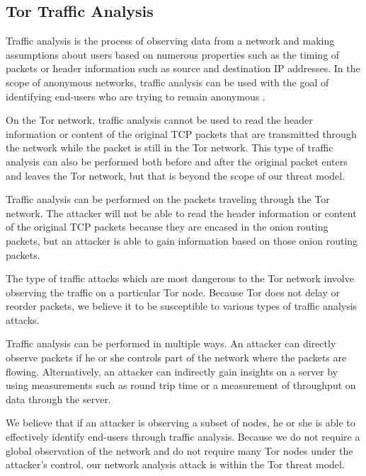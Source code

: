 \documentclass[12pt,journal]{IEEEtran}
\begin{document}
\subsection{Tor Traffic Analysis}
Traffic analysis is the process of observing data from a network and making assumptions about users based on numerous properties such as the timing of packets or header information such as source and destination IP addresses. In the scope of anonymous networks, traffic analysis can be used with the goal of identifying end-users who are trying to remain anonymous \cite{Murdoch:2005:LTA:1058433.1059390}.
\par
On the Tor network, traffic analysis cannot be used to read the header information or content of the original TCP packets that are transmitted through the network while the packet is still in the Tor network. This type of traffic analysis can also be performed both before and after the original packet enters and leaves the Tor network, but that is beyond the scope of our threat model.
\par
Traffic analysis can be performed on the packets traveling through the Tor network. The attacker will not be able to read the header information or content of the original TCP packets because they are encased in the onion routing packets, but an attacker is able to gain information based on those onion routing packets.
\par
The type of traffic attacks which are most dangerous to the Tor network involve observing the traffic on a particular Tor node. Because Tor does not delay or reorder packets, we believe it to be susceptible to various types of traffic analysis attacks.
\par
Traffic analysis can be performed in multiple ways. An attacker can directly observe packets if he or she controls part of the network where the packets are flowing. Alternatively, an attacker can indirectly gain insights on a server by using measurements such as round trip time or a measurement of throughput on data through the server.
\par
We believe that if an attacker is observing a subset of nodes, he or she is able to effectively identify end-users through traffic analysis. Because we do not require a global observation of the network and do not require many Tor nodes under the attacker’s control, our network analysis attack is within the Tor threat model.
\end{document}
